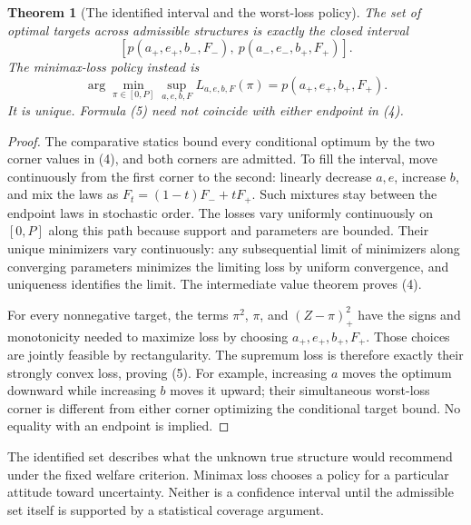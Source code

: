 \documentclass[11pt,a4paper]{article}
\newtheorem{theorem}{Theorem}[section]
\theoremstyle{remark}
\begin{document}
\begin{theorem}[The identified interval and the worst-loss policy]
The set of optimal targets across admissible structures is exactly the closed interval
\[
 [p(a_+,e_+,b_-,F_-),\ p(a_-,e_-,b_+,F_+)]. \tag{4}
\]
The minimax-loss policy instead is
\[
 \arg\min_{\pi\in[0,P]}\sup_{a,e,b,F}L_{a,e,b,F}(\pi)
 =p(a_+,e_+,b_+,F_+). \tag{5}
\]
It is unique. Formula (5) need not coincide with either endpoint in (4).
\end{theorem}
\begin{proof}
The comparative statics bound every conditional optimum by the two corner values in (4), and both corners are admitted. To fill the interval, move continuously from the first corner to the second: linearly decrease $a,e$, increase $b$, and mix the laws as $F_t=(1-t)F_-+tF_+$. Such mixtures stay between the endpoint laws in stochastic order. The losses vary uniformly continuously on $[0,P]$ along this path because support and parameters are bounded. Their unique minimizers vary continuously: any subsequential limit of minimizers along converging parameters minimizes the limiting loss by uniform convergence, and uniqueness identifies the limit. The intermediate value theorem proves (4).

For every nonnegative target, the terms $\pi^2$, $\pi$, and $(Z-\pi)_+^2$ have the signs and monotonicity needed to maximize loss by choosing $a_+,e_+,b_+,F_+$. Those choices are jointly feasible by rectangularity. The supremum loss is therefore exactly their strongly convex loss, proving (5). For example, increasing $a$ moves the optimum downward while increasing $b$ moves it upward; their simultaneous worst-loss corner is different from either corner optimizing the conditional target bound. No equality with an endpoint is implied.
\end{proof}
The identified set describes what the unknown true structure would recommend under the fixed welfare criterion. Minimax loss chooses a policy for a particular attitude toward uncertainty. Neither is a confidence interval until the admissible set itself is supported by a statistical coverage argument.
\end{document}
